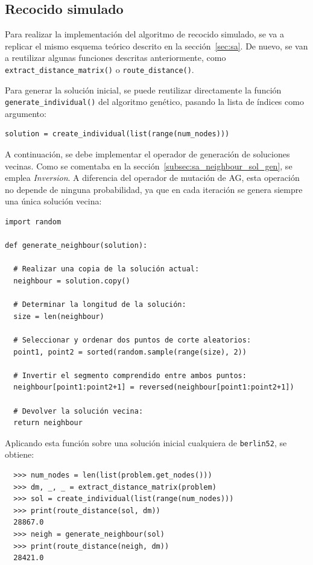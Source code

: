 \subsection{Recocido simulado}
\label{subsec:sa_imp}

Para realizar la implementación del algoritmo de recocido simulado, se va a replicar el mismo esquema teórico descrito en la 
sección~\ref{sec:sa}. De nuevo, se van a reutilizar algunas funciones descritas anteriormente, como 
\texttt{extract\_distance\_matrix()} o \texttt{route\_distance()}. 

Para generar la solución inicial, se puede reutilizar directamente la función \texttt{generate\_individual()} del algoritmo 
genético, pasando la lista de índices como argumento:
\newline
\begin{lstlisting}[style=PythonStyle]
  solution = create_individual(list(range(num_nodes)))
\end{lstlisting}

A continuación, se debe implementar el operador de generación de soluciones vecinas. Como se comentaba en la 
sección~\ref{subsec:sa_neighbour_sol_gen}, se emplea \textit{Inversion}. A diferencia del operador de mutación de AG, esta
operación no depende de ninguna probabilidad, ya que en cada iteración se genera siempre una única solución vecina:
\newline
\begin{lstlisting}[style=PythonStyle]
import random

def generate_neighbour(solution):

  # Realizar una copia de la solución actual:
  neighbour = solution.copy()

  # Determinar la longitud de la solución:
  size = len(neighbour)

  # Seleccionar y ordenar dos puntos de corte aleatorios:
  point1, point2 = sorted(random.sample(range(size), 2))

  # Invertir el segmento comprendido entre ambos puntos:
  neighbour[point1:point2+1] = reversed(neighbour[point1:point2+1])

  # Devolver la solución vecina:
  return neighbour
\end{lstlisting}

Aplicando esta función sobre una solución inicial cualquiera de \texttt{berlin52}, se obtiene:
\begin{verbatim}
  >>> num_nodes = len(list(problem.get_nodes()))
  >>> dm, _, _ = extract_distance_matrix(problem)
  >>> sol = create_individual(list(range(num_nodes)))
  >>> print(route_distance(sol, dm))
  28867.0
  >>> neigh = generate_neighbour(sol)
  >>> print(route_distance(neigh, dm))
  28421.0
\end{verbatim}

